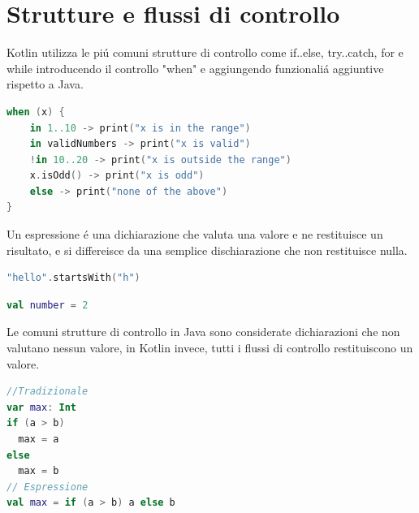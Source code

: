 \section{Strutture e flussi di controllo}
Kotlin utilizza le pi\'u comuni strutture di controllo come if..else, try..catch, for e while introducendo il controllo "when" e aggiungendo funzionali\'a aggiuntive rispetto a Java.

\begin{lstlisting}[language=kotlin,caption={When kotlin}]
when (x) {
    in 1..10 -> print("x is in the range")
    in validNumbers -> print("x is valid")
    !in 10..20 -> print("x is outside the range")
    x.isOdd() -> print("x is odd")
    else -> print("none of the above")
}
\end{lstlisting}


Un espressione \'e una dichiarazione che valuta una valore e ne restituisce un risultato, e si differeisce da una semplice dischiarazione che non restituisce nulla.

\begin{lstlisting}[language=kotlin,caption={Espressione}]
"hello".startsWith("h")
\end{lstlisting}

\begin{lstlisting}[language=kotlin,caption={Dischiarazione}]
val number = 2
\end{lstlisting}

Le comuni strutture di controllo in Java sono considerate dichiarazioni che non valutano nessun valore, in Kotlin invece, tutti i flussi di controllo restituiscono un valore.

\begin{lstlisting}[language=kotlin,caption={esempio espresioni kotlin}]
//Tradizionale
var max: Int
if (a > b)
  max = a
else
  max = b
// Espressione
val max = if (a > b) a else b
\end{lstlisting}


